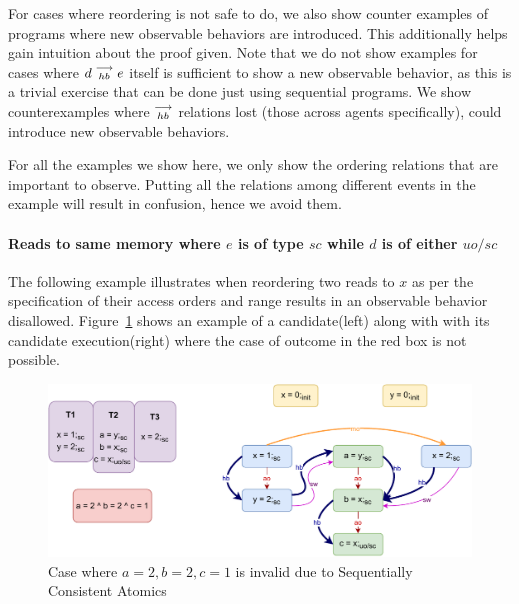 
    For cases where reordering is not safe to do, we also show counter examples of programs where new observable behaviors are introduced.
    This additionally helps gain intuition about the proof given. 
    Note that we do not show examples for cases where $d\stackrel{\longrightarrow}{_{hb}}e$ itself is sufficient to show a new observable behavior, as this is a trivial exercise that can be done just using sequential programs.
    We show counterexamples where $\stackrel{\longrightarrow}{_{hb}}$ relations lost (those across agents specifically), could introduce new observable behaviors. 

    For all the examples we show here, we only show the ordering relations that are important to observe. 
    Putting all the relations among different events in the example will result in confusion, hence we avoid them. 

    \paragraph{Reads to same memory where $e$ is of type $sc$ while $d$ is of either $uo/sc$}

        The following example illustrates when reordering two reads to $x$ as per the specification of their access orders and range results in an observable behavior disallowed.
        Figure~\ref{reord_counter:example1(a)} shows an example of a candidate(left) along with with its candidate execution(right) where the case of outcome in the red box is not possible. 
        \begin{figure}[H]
            \centering
            \includegraphics[scale=0.7]{5.InstructionReordering/4.ValidReorderingCandidate/Example0(Rsc-Ruo,sc).pdf}
            \caption{Case where $a = 2, b = 2, c = 1$ is invalid due to Sequentially Consistent Atomics}
            \label{reord_counter:example1(a)}
        \end{figure}
        
